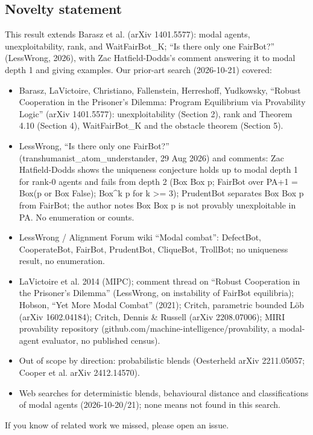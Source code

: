 \documentclass{article}
\begin{document}
\subsection*{Novelty statement}

This result extends Barasz et al. (arXiv 1401.5577): modal agents, unexploitability, rank, and WaitFairBot\_K; ``Is there only one FairBot?'' (LessWrong, 2026), with Zac Hatfield-Dodds's comment answering it to modal depth 1 and giving examples. Our prior-art search (2026-10-21) covered:

\begin{itemize}
\item Barasz, LaVictoire, Christiano, Fallenstein, Herreshoff, Yudkowsky, ``Robust Cooperation in the Prisoner's Dilemma: Program Equilibrium via Provability Logic'' (arXiv 1401.5577): unexploitability (Section 2), rank and Theorem 4.10 (Section 4), WaitFairBot\_K and the obstacle theorem (Section 5).
\item LessWrong, ``Is there only one FairBot?'' (transhumanist\_atom\_understander, 29 Aug 2026) and comments: Zac Hatfield-Dodds shows the uniqueness conjecture holds up to modal depth 1 for rank-0 agents and fails from depth 2 (Box Box p; FairBot over PA+1 = Box(p or Box False); Box\textasciicircum{}k p for k \textgreater{}= 3); PrudentBot separates Box Box p from FairBot; the author notes Box Box p is not provably unexploitable in PA. No enumeration or counts.
\item LessWrong / Alignment Forum wiki ``Modal combat'': DefectBot, CooperateBot, FairBot, PrudentBot, CliqueBot, TrollBot; no uniqueness result, no enumeration.
\item LaVictoire et al. 2014 (MIPC); comment thread on ``Robust Cooperation in the Prisoner's Dilemma'' (LessWrong, on instability of FairBot equilibria); Hobson, ``Yet More Modal Combat'' (2021); Critch, parametric bounded Löb (arXiv 1602.04184); Critch, Dennis \& Russell (arXiv 2208.07006); MIRI provability repository (github.com/machine-intelligence/provability, a modal-agent evaluator, no published census).
\item Out of scope by direction: probabilistic blends (Oesterheld arXiv 2211.05057; Cooper et al. arXiv 2412.14570).
\item Web searches for deterministic blends, behavioural distance and classifications of modal agents (2026-10-20/21); none means not found in this search.
\end{itemize}

If you know of related work we missed, please open an issue.
\end{document}
